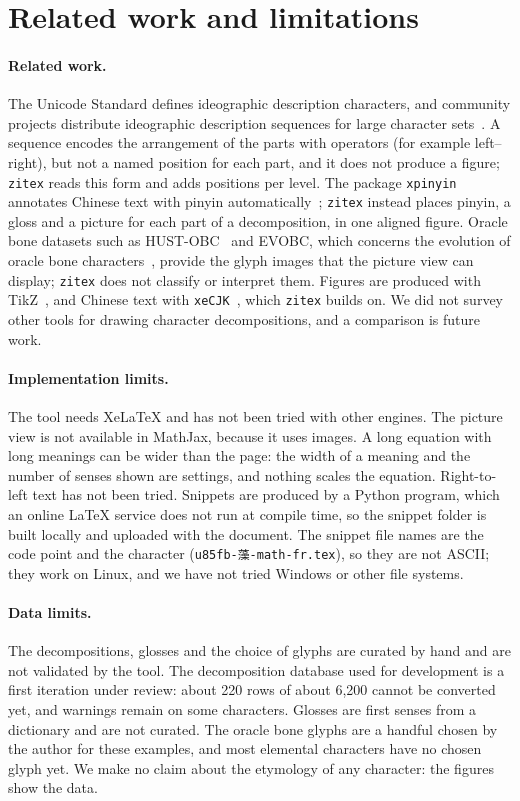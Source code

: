 \documentclass[11pt]{article}
\begin{document}
\section{Related work and limitations}\label{sec:limits}
\paragraph{Related work.} The Unicode Standard defines ideographic description characters, and community projects distribute ideographic description
sequences for large character sets~\cite{cjkviids}. A sequence encodes the arrangement of the parts with operators (for example left--right), but not
a named position for each part, and it does not produce a figure; \texttt{zitex} reads this form and adds positions per level. The package
\texttt{xpinyin} annotates Chinese text with pinyin automatically~\cite{xpinyin}; \texttt{zitex} instead places pinyin, a gloss and a picture for each
part of a decomposition, in one aligned figure. Oracle bone datasets such as HUST-OBC~\cite{hustobc} and EVOBC, which concerns the evolution of oracle bone
characters~\cite{evobc}, provide the glyph images that the picture view can display; \texttt{zitex} does not classify or interpret them. Figures are
produced with TikZ~\cite{tikz}, and Chinese text with \texttt{xeCJK}~\cite{xecjk}, which \texttt{zitex} builds on. We did not survey other tools for
drawing character decompositions, and a comparison is future work.

\paragraph{Implementation limits.} The tool needs XeLaTeX and has not been tried with other engines. The picture view is not available in MathJax,
because it uses images. A long equation with long meanings can be wider than the page: the width of a meaning and the number of senses shown are
settings, and nothing scales the equation. Right-to-left text has not been tried. Snippets are produced by a Python program, which an online
\LaTeX{} service does not run at compile time, so the snippet folder is built locally and uploaded with the document. The snippet file names are the code point and
the character (\texttt{u85fb-藻-math-fr.tex}), so they are not ASCII; they work on Linux, and we have not tried Windows or other file systems.

\paragraph{Data limits.} The decompositions, glosses and the choice of glyphs are curated by hand and are not validated by the tool. The decomposition
database used for development is a first iteration under review: about 220 rows of about 6,200 cannot be converted yet, and warnings remain on some
characters. Glosses are first senses from a dictionary and are not curated. The oracle bone glyphs are a handful chosen by the author for these
examples, and most elemental characters have no chosen glyph yet. We make no claim about the etymology of any character: the figures show the data.
\end{document}
